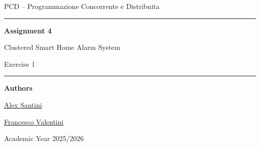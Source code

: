 \begin{titlepage}
    \centering
    \vspace*{2.2cm}

    {\Large PCD -- Programmazione Concorrente e Distribuita\par}
    \vspace{1.2cm}
    {\rule{0.82\textwidth}{0.5pt}\par}
    \vspace{0.9cm}
    {\huge\bfseries Assignment 4\par}
    \vspace{0.35cm}
    {\LARGE Clustered Smart Home Alarm System\par}
    \vspace{0.25cm}
    {\large Exercise 1\par}
    \vspace{0.9cm}
    {\rule{0.82\textwidth}{0.5pt}\par}

    \vspace{1.6cm}
    {\large\textbf{Authors}\par}
    \vspace{0.25cm}
    {\large \href{https://github.com/AlexSantini10}{Alex Santini}\par}
    {\large \href{https://github.com/Val0rous}{Francesco Valentini}\par}

    \vfill
    {\large Academic Year 2025/2026\par}
    {\large \todayFullUK\par}
\end{titlepage}

